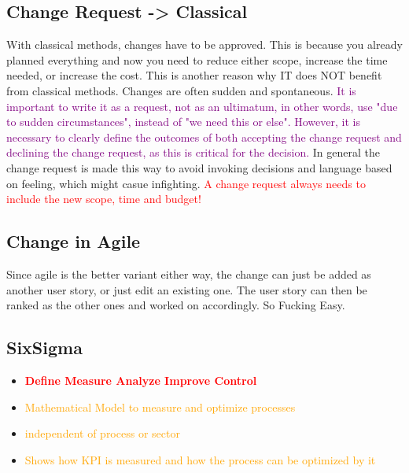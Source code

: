 \documentclass[main.tex,fontsize=12pt,paper=a4,paper=landscape,DIV=calc,]{scrartcl}
\begin{document}
\begin{multicols*}{2}
\subsection{Change Request -> Classical}
With classical methods, changes have to be approved. This is because you already planned everything and now you need to reduce either scope, increase the time needed, or increase the cost. \newline
This is another reason why IT does NOT benefit from classical methods. Changes are often sudden and spontaneous. \newline
\textcolor{purple}{It is important to write it as a request, not as an ultimatum, in other words, use "due to sudden circumstances", instead of "we need this or else".\newline
However, it is necessary to clearly define the outcomes of both accepting the change request and declining the change request, as this is critical for the decision.}\newline
In general the change request is made this way to avoid invoking decisions and language based on feeling, which might casue infighting.\newline
\textcolor{red}{A change request always needs to include the new scope, time and budget!}

\subsection{Change in Agile}
Since agile is the better variant either way, the change can just be added as another user story, or just edit an existing one.\newline
The user story can then be ranked as the other ones and worked on accordingly. \newline
So Fucking Easy. 

\subsection{SixSigma} 
\begin{itemize}
\item \textcolor{red}{\textbf{Define Measure Analyze Improve Control}}
\item \textcolor{orange}{Mathematical Model to measure and optimize processes}
\item \textcolor{orange}{independent of process or sector}
\item \textcolor{orange}{Shows how KPI is measured and how the process can be optimized by it}
\end{itemize}


\end{multicols*}
\end{document}
